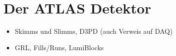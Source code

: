 


%
\section{Der ATLAS Detektor}
\label{atlas_detector}

\begin{itemize}
    \item Skimms und Slimms, D3PD (auch Verweis auf DAQ)
    \item GRL, Fills/Runs, LumiBlocks
\end{itemize}
